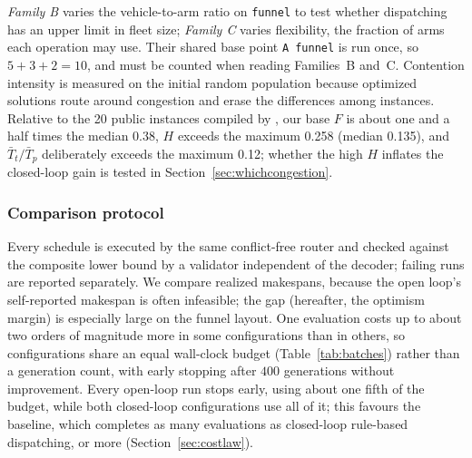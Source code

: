 \documentclass[preprint,review,12pt,authoryear,doubleblind]{elsarticle}
\newcommand{\NCases}{10}
\newcommand{\PubFMed}{0.38}              %
\newcommand{\PubHMed}{0.135}             %
\newcommand{\PubHMax}{0.258}             %
\newcommand{\PubTtTpHi}{0.12}            %
\newcommand{\PubNInst}{20}
\begin{document}
\emph{Family B} varies the vehicle-to-arm ratio on \texttt{funnel} to test whether dispatching has an upper limit in fleet size; \emph{Family C} varies flexibility, the fraction of arms each operation may use.
Their shared base point \texttt{A funnel} is run once, so $5+3+2=\NCases$, and must be counted when reading Families~B and~C.
Contention intensity is measured on the initial random population because optimized solutions route around congestion and erase the differences among instances.
Relative to the \PubNInst{} public instances compiled by \citet{homayouni2021production}, our base $F$ is about one and a half times the median \PubFMed{}, $H$ exceeds the maximum \PubHMax{} (median \PubHMed{}), and $\bar{T}_t/\bar{T}_p$ deliberately exceeds the maximum \PubTtTpHi{}; whether the high $H$ inflates the closed-loop gain is tested in Section~\ref{sec:whichcongestion}.

\begin{table}[!htbp]
\caption{Controlled instances. Shared core: $12$ jobs, $36$ real operations, $8$ arms, $H=0.3$, $\bar{T}_t/\bar{T}_p\approx4.0$.
Contention intensity: share of yielding wait in travel time on the initial random population.}
\label{tab:instances}
\small

\end{table}

\subsubsection{Comparison protocol}
\label{sec:protocol}

Every schedule is executed by the same conflict-free router and checked against the composite lower bound by a validator independent of the decoder; failing runs are reported separately.
We compare realized makespans, because the open loop's self-reported makespan is often infeasible; the gap (hereafter, the optimism margin) is especially large on the funnel layout.
One evaluation costs up to about two orders of magnitude more in some configurations than in others, so configurations share an equal wall-clock budget (Table~\ref{tab:batches}) rather than a generation count, with early stopping after $400$ generations without improvement.
Every open-loop run stops early, using about one fifth of the budget, while both closed-loop configurations use all of it; this favours the baseline, which completes as many evaluations as closed-loop rule-based dispatching, or more (Section~\ref{sec:costlaw}).
\end{document}

